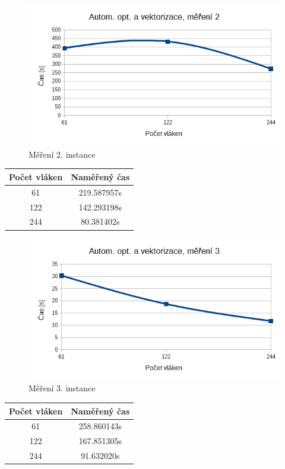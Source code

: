 \documentclass[12pt]{article}
\begin{document}
\begin{figure}[H]
  \begin{center}
      \includegraphics[width=12cm]{images/phi2.png}	
    \caption{Měření 2. instance} 
  \end{center}
\end{figure}
%
%
\begin{center}
\begin{tabular}{ c | c }
\textbf{Počet vláken} & \textbf{Naměřený čas} \\ \hline \hline 
61 & 219.587957s \\ \hline
122 & 142.293198s \\ \hline
244 & 80.381402s \\ \hline
\end{tabular}
\end{center}

\begin{figure}[H]
  \begin{center}
      \includegraphics[width=12cm]{images/phi3.png}	
    \caption{Měření 3. instance} 
  \end{center}
\end{figure}
%
%
\begin{center}
\begin{tabular}{ c | c }
\textbf{Počet vláken} & \textbf{Naměřený čas} \\ \hline \hline 
61 & 258.860143s \\ \hline
122 & 167.851305s \\ \hline
244 & 91.632020s \\ \hline
\end{tabular}
\end{center}
\end{document}
